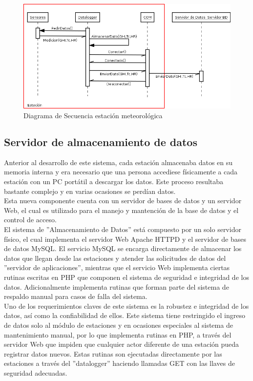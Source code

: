 \begin{figure}[h!]
        \centering
        \includegraphics[scale=0.5]{images/estacionSecuencia}
        \caption{Diagrama de Secuencia estación meteorológica}
        \label{despliegue}
\end{figure}

\subsection{Servidor de almacenamiento de datos}
Anterior al desarrollo de este sistema, cada estación almacenaba datos en su memoria interna y era necesario que una persona accediese físicamente a cada estación con un PC portátil a descargar los datos. Este proceso resultaba bastante complejo y en varias ocasiones se perdían datos.\\
Esta nueva componente cuenta con un servidor de bases de datos y un servidor Web, el cual es utilizado para el manejo y mantención de la base de datos y el control de acceso.\\

El sistema de ''Almacenamiento de Datos'' está compuesto por un solo servidor físico, el cual implementa el servidor Web Apache HTTPD y el servidor de bases de datos MySQL. El servicio MySQL se encarga directamente de almacenar los datos que llegan desde las estaciones y atender las solicitudes de datos del ''servidor de aplicaciones'', mientras que el servicio Web implementa ciertas rutinas escritas en PHP que componen el sistema de seguridad e integridad de los datos. Adicionalmente implementa rutinas que forman parte del sistema de respaldo manual para casos de falla del sistema.\\

Uno de los requerimientos claves de este sistema es la robustez e integridad de los datos, así como la confiabilidad de ellos. Este sistema tiene restringido el ingreso de datos solo al módulo de estaciones y en ocasiones especiales al sistema de mantenimiento manual, por lo que implementa rutinas en PHP, a través del servidor Web que impiden que cualquier actor diferente de una estación pueda registrar datos nuevos. Estas rutinas son ejecutadas directamente por las estaciones a través del ''datalogger'' haciendo llamadas GET con las llaves de seguridad adecuadas.\\

